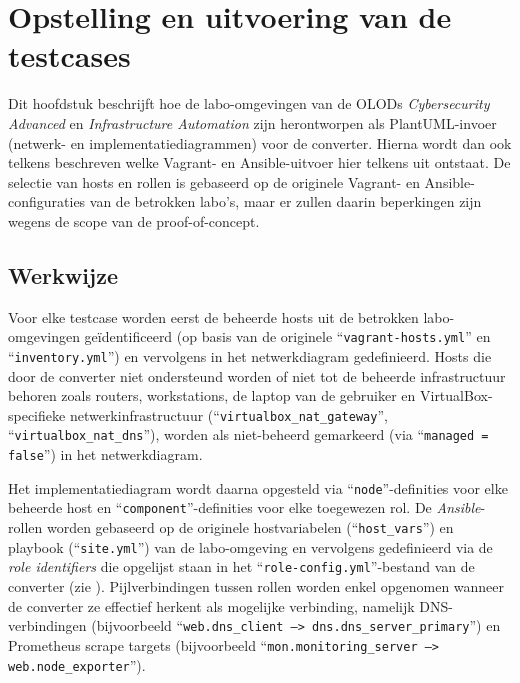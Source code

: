 
\chapter{Opstelling en uitvoering van de testcases}%
\label{ch:testcases}

Dit hoofdstuk beschrijft hoe de labo-omgevingen van de OLODs \emph{Cybersecurity Advanced} en \emph{Infrastructure Automation} zijn herontworpen als PlantUML-invoer (netwerk- en implementatiediagrammen) voor de converter. Hierna wordt dan ook telkens beschreven welke Vagrant- en Ansible-uitvoer hier telkens uit ontstaat. De selectie van hosts en rollen is gebaseerd op de originele Vagrant- en Ansible-configuraties van de betrokken labo's, maar er zullen daarin beperkingen zijn wegens de scope van de proof-of-concept.

\section{Werkwijze}%
\label{sec:werkwijze_testcases}

Voor elke testcase worden eerst de beheerde hosts uit de betrokken labo-omgevingen geïdentificeerd (op basis van de originele ``\texttt{vagrant-hosts.yml}'' en ``\texttt{inventory.yml}'') en vervolgens in het netwerkdiagram gedefinieerd.
Hosts die door de converter niet ondersteund worden of niet tot de beheerde infrastructuur behoren zoals routers, workstations, de laptop van de gebruiker en VirtualBox-specifieke netwerkinfrastructuur (``\texttt{virtualbox\_nat\_gateway}'', ``\texttt{virtualbox\_nat\_dns}''), worden als niet-beheerd gemarkeerd (via ``\texttt{managed = false}'') in het netwerkdiagram.

Het implementatiediagram wordt daarna opgesteld via ``\texttt{node}''-definities voor elke beheerde host en ``\texttt{component}''-definities voor elke toegewezen rol.
De \emph{Ansible}-rollen worden gebaseerd op de originele hostvariabelen (``\texttt{host\_vars}'') en playbook (``\texttt{site.yml}'') van de labo-omgeving en vervolgens gedefinieerd via de \emph{role identifiers} die opgelijst staan in het ``\texttt{role-config.yml}''-bestand van de converter (zie ).
Pijlverbindingen tussen rollen worden enkel opgenomen wanneer de converter ze effectief herkent als mogelijke verbinding, namelijk DNS-verbindingen (bijvoorbeeld ``\texttt{web.dns\_client --> dns.dns\_server\_primary}'') en Prometheus scrape targets (bijvoorbeeld ``\texttt{mon.monitoring\_server --> web.node\_exporter}'').

